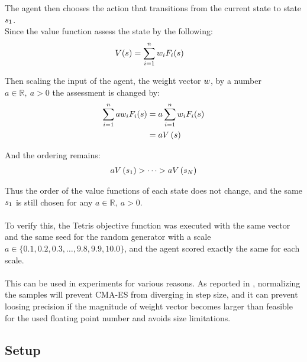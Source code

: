 The agent then chooses the action that transitions from the current state 
to state $s_1$.\\
Since the value function assess the state by the following:
\begin{align*}
V (s ) &= 
\sum_{i=1}^{n} w _{i}F _{i}(s )
\end{align*}

Then scaling the input of the agent, the weight vector $w$, by a
number $a \in \mathbb{R}, \ a > 0$ the assessment is changed by:
\begin{align*}
\sum_{i=1}^{n} a w _{i}F _{i}(s ) &= 
a\sum_{i=1}^{n} w _{i}F _{i}(s )\\
&= a V \left( s \right)
\end{align*}

And the ordering remains:
\begin{align*}
a V \left(  s_1 \right) 
> \dots 
> a V \left( s_N \right)
\end{align*}

Thus the order of the value functions of 
each state does not change, and the same $s_1$
is still chosen for any $a \in \mathbb{R}, \ a > 0$.\\
\\
To verify this, the Tetris objective function was executed with the
same vector and the same seed for the random generator with a scale
$a \in \{0.1, 0.2,0.3, \dots, 9.8,9.9,10.0\}$, and the agent scored 
exactly the same for each scale.\\
\\
This can be used in experiments for various reasons. As reported 
in \citep{boumaza2009}, normalizing the samples will 
prevent CMA-ES from diverging in step size,
and it can prevent loosing precision if the magnitude of weight 
vector becomes larger than feasible for the used floating 
point number and avoids size limitations.



\subsection{Setup}

